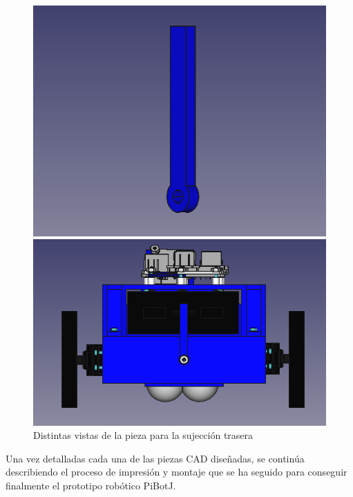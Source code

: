 \begin{figure}[ht!]
	\centering
	\begin{minipage}{0.365\linewidth}
		\centering
		\includegraphics[width=\linewidth]{figs/cap5/trasera2.png}
	\end{minipage}
	\hspace{1cm}
	\begin{minipage}{0.45\linewidth}
		\centering
		\includegraphics[width=\linewidth]{figs/cap5/traseracon.png}
	\end{minipage}
	\caption{Distintas vistas de la pieza para la sujección trasera}
	\label{fig:ptrasera}
\end{figure}

Una vez detalladas cada una de las piezas CAD diseñadas, se continúa describiendo el proceso de impresión y montaje que se ha seguido para conseguir finalmente el prototipo robótico PiBotJ.
  
